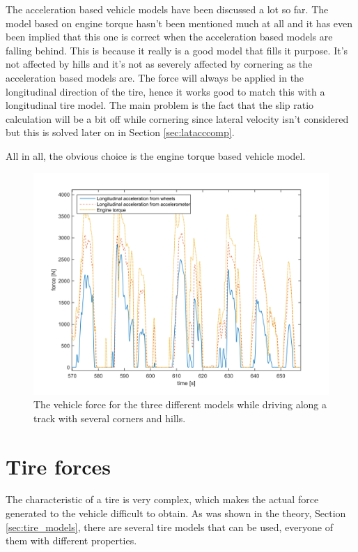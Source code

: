 The acceleration based vehicle models have been discussed a lot so far. The model based on engine torque hasn't been mentioned much at all and it has even been implied that this one is correct when the acceleration based models are falling behind. This is because it really is a good model that fills it purpose. It's not affected by hills and it's not as severely affected by cornering as the acceleration based models are. The force will always be applied in the longitudinal direction of the tire, hence it works good to match this with a longitudinal tire model. The main problem is the fact that the slip ratio calculation will be a bit off while cornering since lateral velocity isn't considered but this is solved later on in Section \ref{sec:latacccomp}. 

All in all, the obvious choice is the engine torque based vehicle model.

\begin{figure}[h]
	\centering
	\includegraphics[width=1\textwidth]{Pictures/vehicle_model_comp_mm2}
	\caption{The vehicle force for the three different models while driving along a track with several corners and hills.}
	\label{vehicle_model_comp_mm2}
\end{figure}

\section{Tire forces}
\label{tire_forces}
The characteristic of a tire is very complex, which makes the actual force generated to the vehicle difficult to obtain. As was shown in the theory, Section \ref{sec:tire_models}, there are several tire models that can be used, everyone of them with different properties.

